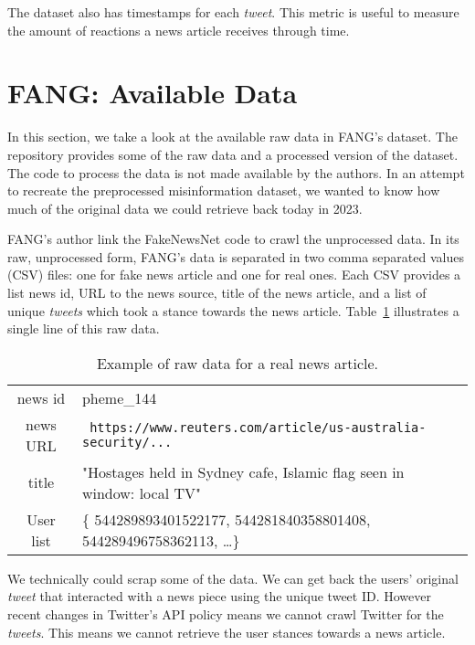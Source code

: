The dataset also has timestamps for each \textit{tweet}.
This metric is useful to measure the amount of reactions a news article receives through time.

\section{FANG: Available Data}

In this section, we take a look at the available raw data in FANG's dataset.
The repository provides some of the raw data and a processed version of the dataset.
The code to process the data is not made available by the authors.
In an attempt to recreate the preprocessed misinformation dataset, we wanted to know how much of the original data we could retrieve back today in 2023.

FANG's author link the FakeNewsNet code to crawl the unprocessed data.
In its raw, unprocessed form, FANG's data is separated in two comma separated values (CSV) files: one for fake news article and one for real ones.
Each CSV provides a list news id, URL to the news source, title of the news article, and a list of unique \textit{tweets} which took a stance towards the news article.
Table~\ref{tab:fang_raw_data} illustrates a single line of this raw data.

\begin{table}[h]
    \caption{Example of raw data for a real news article.}
    \label{tab:fang_raw_data}
    \begin{tabular}{cl}
        \toprule
        news id & pheme\_144\\
        news URL & \verb| https://www.reuters.com/article/us-australia-security/...|\\
        title & "Hostages held in Sydney cafe, Islamic flag seen in window: local TV"\\
        User list & \{ 544289893401522177, 544281840358801408, 544289496758362113, \dots \} \\
        \bottomrule
    \end{tabular}
\end{table}

We technically could scrap some of the data.
We can get back the users' original \textit{tweet} that interacted with a news piece using the unique tweet ID.
However recent changes in Twitter's API policy means we cannot crawl Twitter for the \textit{tweets}.
This means we cannot retrieve the user stances towards a news article.

